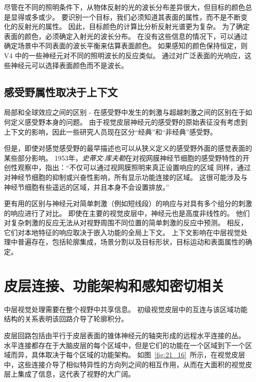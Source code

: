 尽管在不同的照明条件下，从物体反射的光的波长分布差异很大，但目标的颜色总是显得或多或少。
要识别一个目标，我们必须知道其表面的属性，而不是不断变化的反射光的属性。
因此，目标颜色的计算比分析反射光谱更为复杂。
为了确定表面的颜色，必须确定入射光的波长分布。
在没有这些信息的情况下，可以通过确定场景中不同表面的波长平衡来估算表面颜色。
如果感知的颜色保持恒定，则 V4 中的一些神经元对不同的照明波长的反应类似。
通过对广泛表面的光响应，这些神经元可以选择表面颜色而不是波长。



\subsection{感受野属性取决于上下文}

局部和全球效应之间的区别 - 在感受野中发生的刺激与超越刺激之间的区别在于如何定义感受野本身的问题。
由于视觉皮层神经元的感受野的原始表征没有考虑到上下文的影响，因此一些研究人员现在区分“经典”和“非经典”感受野。


但是，即使对感觉感受野的最早描述也可以从狭义定义的感受野外面的感觉表面的某些部分影响。
1953年，\textit{史蒂文$\cdot$库夫勒}在对视网膜神经节细胞的感受野特性的开创性观察中，指出：“不仅可以通过视网膜照明来真正设置响应的区域 同样，通过对神经节细胞的抑制或兴奋性影响，所有显示功能连接的区域。
这很可能涉及与神经节细胞有些遥远的区域，并且本身不会设置排放。”


更有用的区别与神经元对简单刺激（例如短线段）的响应与对具有多个组分的刺激的响应进行了对比。
即使在主要的视觉皮层中，神经元也是高度非线性的。
他们对复杂刺激的反应无法从对视野周围不同位置的简单刺激的反应中预测。
相反，它们对本地特征的响应取决于嵌入功能的全局上下文。
上下文影响在中层视觉处理中普遍存在，包括轮廓集成，场景分割以及目标形状，目标运动和表面属性的确定。



\section{皮层连接、功能架构和感知密切相关}

中层视觉处理需要在整个视野中共享信息。
初级视觉皮层中的互连与该区域功能结构的关系表明该回路介导了轮廓积分。


皮层回路包括由平行于皮层表面的锥体神经元的轴突形成的远程水平连接的丛。
水平连接都存在于大脑皮层的每个区域中，但是它们的功能在一个区域到下一个区域而异，具体取决于每个区域的功能架构。
如图~\ref{fig:21_16}~所示，在视觉皮层中，这些连接介导了相似特异性的方向列之间的相互作用，从而在大面积的视觉皮层上集成了信息，这代表了视野的大广阔。


